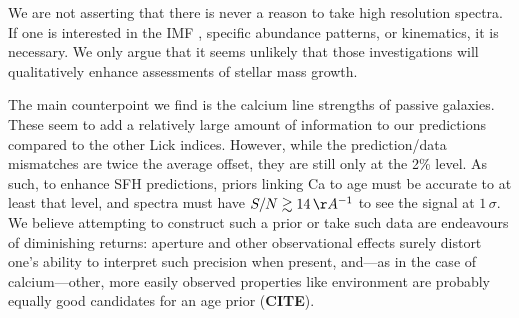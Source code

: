 \documentclass[a4paper,fleqn,usenatbib]{mnras}
\newcommand{\bfr}{\bf\color{red}}
\newcommand{\CITE}{{\bfr CITE}}
\begin{document}




We are not asserting that there is never a reason to take high resolution spectra. If 
one is interested in the IMF \citep{Conroy12}, specific abundance patterns, or kinematics, it is 
necessary. We only argue that it seems unlikely that those investigations will
qualitatively enhance assessments of stellar mass growth.

The main counterpoint we find is the calcium line strengths of passive galaxies. These seem to 
add a relatively large amount of information to our predictions compared to the other Lick indices. 
However, while the prediction/data mismatches are twice the average offset, they are still only at 
the 2\% level. As such, to enhance SFH predictions, priors 
linking Ca to age must be accurate to at least that level, and spectra must have 
$S/N\gtrsim14\,\AA^{-1}$ to see the signal at $1\,\sigma$. We believe attempting to construct 
such a prior or take such data are endeavours of diminishing returns: aperture and other 
observational effects surely distort one's ability to interpret such precision when present, 
and---as in the case of calcium---other, more easily observed properties like environment
are probably equally good candidates for an age prior (\CITE).
\end{document}
